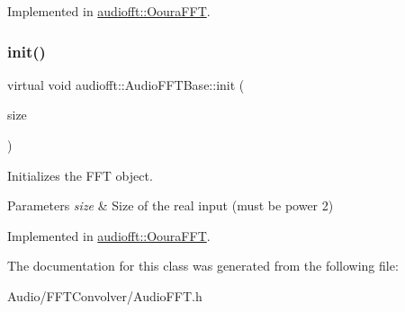 Implemented in \hyperlink{classaudiofft_1_1_ooura_f_f_t_a751001432c5a03a99ae9684c71864d56}{audiofft\+::\+Ooura\+F\+FT}.

\mbox{\label{classaudiofft_1_1_audio_f_f_t_base_a32447c362c9c78c570c5117762b190d4}} 
\subsubsection{\texorpdfstring{init()}{init()}}
{\footnotesize\ttfamily virtual void audiofft\+::\+Audio\+F\+F\+T\+Base\+::init (\begin{DoxyParamCaption}\item[{size\+\_\+t}]{size }\end{DoxyParamCaption})\hspace{0.3cm}{\ttfamily [pure virtual]}}



Initializes the F\+FT object. 


\begin{DoxyParams}{Parameters}
{\em size} & Size of the real input (must be power 2) \\
\hline
\end{DoxyParams}


Implemented in \hyperlink{classaudiofft_1_1_ooura_f_f_t_ad5e0f74be03f4b76f134a7fcfe4718d9}{audiofft\+::\+Ooura\+F\+FT}.



The documentation for this class was generated from the following file\+:\begin{DoxyCompactItemize}
\item 
Audio/\+F\+F\+T\+Convolver/Audio\+F\+F\+T.\+h\end{DoxyCompactItemize}
